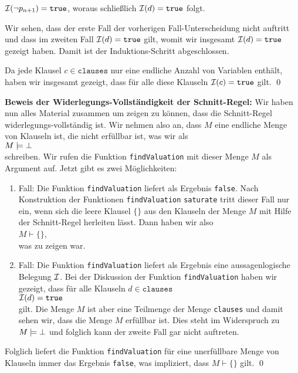 \begin{enumerate}
\begin{enumerate}
\begin{enumerate}
                         $\mathcal{I}(\neg p_{n+1}) = \mathtt{true}$, woraus schlie\ss{}lich $\mathcal{I}(d) = \mathtt{true}$ folgt.
                   \end{enumerate}
                   Wir sehen, dass der erste Fall der vorherigen Fall-Unterscheidung nicht
                   auftritt und dass im zweiten Fall $\mathcal{I}(d) = \mathtt{true}$ gilt, womit wir insgesamt 
                   $\mathcal{I}(d) = \mathtt{true}$ gezeigt haben.  Damit ist der Induktions-Schritt
                   abgeschlossen.
             \end{enumerate}
             Da jede Klausel $c \in \mathtt{clauses}$ nur eine endliche Anzahl von Variablen
             enth\"{a}lt, haben wir insgesamt gezeigt, dass f\"{u}r alle diese Klauseln 
             $\mathcal{I}(c) = \mathtt{true}$ gilt. \qed
\end{enumerate}

\noindent
\textbf{Beweis der Widerlegungs-Vollst\"{a}ndigkeit der Schnitt-Regel:}
Wir haben nun alles Material zusammen um zeigen zu k\"{o}nnen, dass die Schnitt-Regel
widerlegungs-vollst\"{a}ndig ist.  Wir nehmen also an, dass $M$ eine endliche Menge von Klauseln ist,  die nicht
erf\"{u}llbar ist, was wir als
\\[0.2cm]
\hspace*{1.3cm}
$M \models \bot$ 
\\[0.2cm]
schreiben.  Wir rufen die Funktion \texttt{findValuation} mit dieser Menge $M$ als Argument auf.
Jetzt gibt es zwei M\"{o}glichkeiten:
\begin{enumerate}
\item Fall: Die Funktion \texttt{findValuation} liefert als Ergebnis \texttt{false}.  Nach
      Konstruktion der Funktionen \texttt{findValuation} \texttt{saturate} tritt dieser Fall nur
      ein, wenn sich die leere Klausel $\{\}$ aus den Klauseln der Menge $M$ mit Hilfe der
      Schnitt-Regel herleiten l\"{a}sst.  Dann haben wir also
      \\[0.2cm]
      \hspace*{1.3cm}
      $M \vdash \{\}$,
      \\[0.2cm]
      was zu zeigen war.
\item Fall: Die Funktion \texttt{findValuation} liefert als Ergebnis eine aussagenlogische Belegung
      $\mathcal{I}$.  Bei der Diskussion der Funktion \texttt{findValuation} haben wir gezeigt, dass f\"{u}r
      alle Klauseln $d \in \mathtt{clauses}$
      \\[0.2cm]
      \hspace*{1.3cm}
      $\mathcal{I}(d) = \mathtt{true}$
      \\[0.2cm]
      gilt.  Die Menge $M$ ist aber eine Teilmenge der Menge \texttt{clauses} und damit sehen wir, dass die
      Menge $M$ erf\"{u}llbar ist.  Dies steht im Widerspruch zu $M \models \bot$ und folglich kann der
      zweite Fall gar nicht auftreten. 
\end{enumerate}
Folglich liefert die Funktion \texttt{findValuation} f\"{u}r eine unerf\"{u}llbare Menge von Klauseln immer
das Ergebnis \texttt{false}, was impliziert, dass $M \vdash \{\}$ gilt.  \qed

